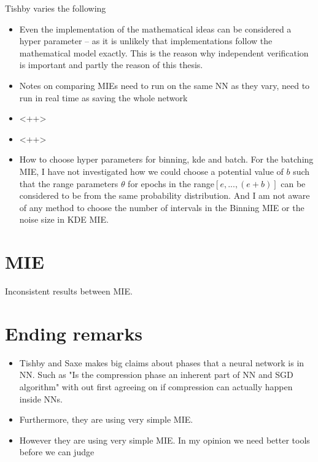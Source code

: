 \documentclass[dissertation.tex]{subfiles}
\begin{document}
Tishby varies the following 
\begin{itemize}
  \item{
      Even the implementation of the mathematical ideas can be considered a
      hyper parameter -- as it is unlikely that implementations follow the
      mathematical model exactly. This is the reason why independent
      verification is important and partly the reason of this thesis.
    }
  \item{
      Notes on comparing MIEs need to run on the same NN as they vary, need to
      run in real time as saving the whole network
    }
  \item{
      <++>
    }
  \item{
      <++>
    }
  \item{
      How to choose hyper parameters for binning, kde and batch. For the
      batching MIE, I have not
      investigated how we could choose a potential value of $b$ such that the
      range parameters $\theta$ for epochs in the range$[e,...,(e+b)]$ can be
      considered to be from the same probability distribution. And I am not
      aware of any method to choose the number of intervals in the Binning MIE
      or the noise size in KDE MIE.
    }
\end{itemize}

\section{MIE}

Inconsistent results between MIE.

\section{Ending remarks}
 
\begin{itemize}
  \item{
      Tishby and Saxe makes big claims about phases that a neural network is in
      NN. Such as "Is the compression phase an inherent part of NN and SGD
      algorithm" with out first agreeing on if compression can actually happen
      inside NNs.
    }
  \item{
      Furthermore, they are using very simple MIE.
    }
  \item{
      However they are using very simple MIE. In my opinion we need better tools
      before we can judge 
    }
\end{itemize}
\end{document}
